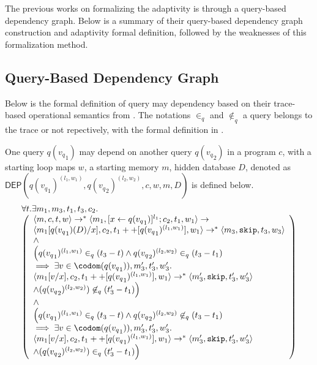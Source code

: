 The previous works on formalizing the adaptivity is through a query-based dependency graph.
Below is a summary of their query-based dependency graph construction and adaptivity formal definition, followed
by the weaknesses of this formalization method.
\subsection*{Query-Based Dependency Graph}
Below is the formal definition of query may dependency based on their trace-based operational semantics from .
The notations $\in_q$ and $\not\in_q$ a query belongs to the trace or not repectively, with the formal definition in .

\begin{defn}
One query $q({v_q}_1)$ may depend on another query $q({v_q}_2)$ in a program $c$, with a starting loop maps $w$, a starting memory $m$, hidden database $D$, denoted as \\
$\mathsf{DEP}(q({v_q}_1)^{(l_1, w_1)}, q({v_q}_2)^{(l_2, w_2)}, c,w, m, D)$ is defined below. 
\[
\begin{array}{l}
\forall  t. \exists m_1,m_3,t_1,t_3,c_2.\\
  \left (\begin{array}{l}   
\config{m, c,  t,w} \rightarrow^{*} \config{m_1, [\assign{x}{q({v_q}_1)}]^{l_1} ; c_2,
  t_1,w_1} \rightarrow \\ \config{m_1[q({v_q}_1)(D)/x], c_2,
  t_1++[q({v_q}_1)^{(l_1, w_1)}], w_1} \rightarrow^{*} \config{m_3, \eskip,
  t_3,w_3} \\  
  \land \\
\Big( q({v_q}_1)^{(l_1,w_1)} \in_{q} (t_3-t) \land q({v_q}_2)^{(l_2,w_2)} \in_{q} (t_3-t_1) \\ \implies  \exists v \in \codom(q({v_q}_1)), m_3', t_3', w_3'.  \\
 \config{m_1[v/x], {c_2}, t_1++[q({v_q}_1)^{(l_1,w_1)}], w_1} \rightarrow^{*} \config{m_3', \eskip, t_3', w_3'} \\ \land (q({v_q}_2)^{(l_2,w_2)}) \not \in_{q} (t_3'-t_1)
\Big)\\
\land \\
\Big(q({v_q}_1)^{(l_1,w_1)} \in_{q} (t_3-t) \land q({v_q}_2)^{(l_2,w_2)} \not\in_{q} (t_3-t_1) \\ \implies  \exists v \in \codom(q({v_q}_1)),  m_3', t_3', w_3'. \\
 \config{m_1[v/x], {c_2}, t_1++[q({v_q}_1)^{(l_1,w_1)}], w_1} \rightarrow^{*} \config{m_3', \eskip, t_3', w_3'} \\ \land (q({v_q}_2)^{(l_2,w_2)})  \in_{q} (t_3'-t_1)
\Big)
\end{array} \right )
\end{array}
\]
\end{defn}
